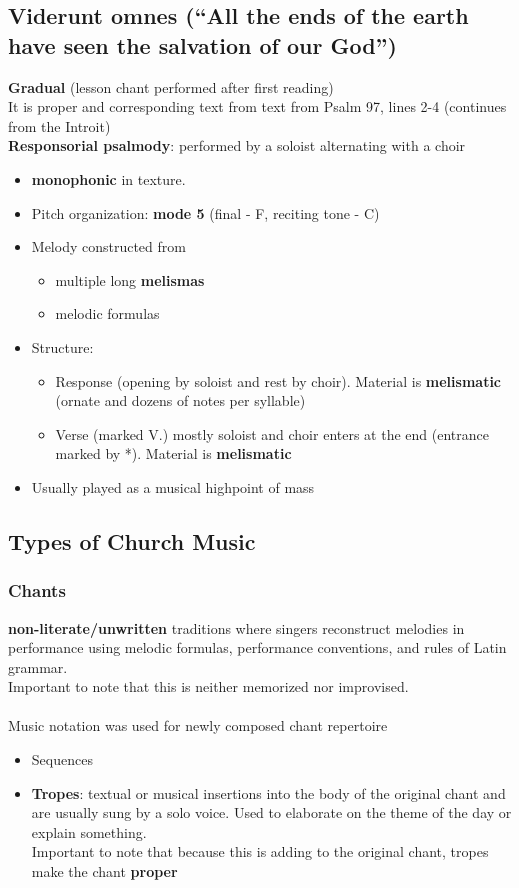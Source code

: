 \documentclass{article}
\begin{document}
  \subsection{Viderunt omnes (“All the ends of the earth have seen the salvation of our God”)}
  \textbf{Gradual} (lesson chant performed after first reading) \\
  It is proper and corresponding text from text from Psalm 97, lines 2-4 (continues from the Introit) \\
  \textbf{Responsorial psalmody}: performed by a soloist alternating with a choir
  \begin{itemize}
    \item \textbf{monophonic} in texture.
    \item Pitch organization: \textbf{mode 5} (final - F, reciting tone - C)
    \item Melody constructed from
      \begin{itemize}
        \item multiple long \textbf{melismas}
        \item melodic formulas
      \end{itemize}
    \item Structure: 
    \begin{itemize}
      \item Response (opening by soloist and rest by choir). Material is \textbf{melismatic} (ornate and dozens of notes per syllable)
      \item Verse (marked V.) mostly soloist and choir enters at the end (entrance marked by *). Material is \textbf{melismatic}
    \end{itemize}
    \item Usually played as a musical highpoint of mass
  \end{itemize}
  \subsection{Types of Church Music}
  \subsubsection{Chants}
  \textbf{non-literate/unwritten} traditions where singers reconstruct melodies in performance using melodic formulas, performance conventions, and rules of Latin grammar.\\
  Important to note that this is neither memorized nor improvised. \\ \\
  Music notation was used for newly composed chant repertoire
  \begin{itemize}
    \item Sequences
    \item \textbf{Tropes}: textual or musical insertions into the body of the original chant and are usually sung by a solo voice. Used to elaborate on the theme of the day or explain something. \\
      Important to note that because this is adding to the original chant, tropes make the chant \textbf{proper}
  \end{itemize}
\end{document}
